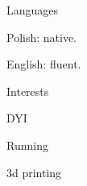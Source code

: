 \begin{cventries}
  \cventry
    {Languages} %
    {} %
    {} %
    {} %
    {
      \begin{cvitems} %
        \item {Polish: native.}
        \item {English: fluent.}
      \end{cvitems}
    }

  \cventry
    {Interests} %
    {} %
    {} %
    {} %
    {
      \begin{cvitems} %
        \item {DYI}
        \item {Running}
        \item {3d printing}
      \end{cvitems}
    }
\end{cventries}

